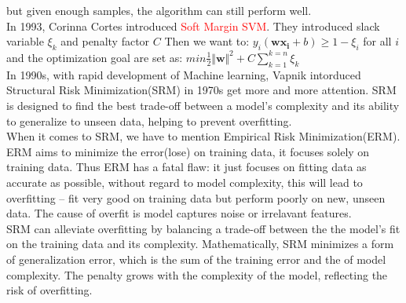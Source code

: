 \documentclass{article}
\begin{document}
but given enough samples, the algorithm can still perform well.\\
\indent In 1993, Corinna Cortes introduced \textcolor{red}{Soft Margin SVM}. They introduced slack variable $\xi_k$ and penalty factor $C$ Then we want to:
$y_i(\bm{w}\bm{x_i} + b) \geq 1 - \xi_i $ for all $i$ \\
and the optimization goal are set as: $min   \frac{1}{2}\Vert \bm{w} \Vert^2 + C\sum_{k=1}^{k=n}\xi_k$\\
\indent In 1990s, with rapid development of Machine learning, Vapnik intorduced Structural Risk Minimization(SRM) in 1970s get more and more attention.
SRM is designed to find the best trade-off between a model’s complexity and its ability to generalize to unseen data, helping to prevent overfitting.\\
\indent When it comes to SRM, we have to mention Empirical Risk Minimization(ERM). ERM aims to minimize the error(lose) on training data, it focuses solely on training data.
Thus ERM has a fatal flaw: it just focuses on fitting data as accurate as possible, without regard to model complexity, this will lead to overfitting
-- fit very good on training data but perform poorly on new, unseen data. The cause of overfit is model captures noise or irrelavant features.\\
\indent SRM can alleviate overfitting by balancing a trade-off between the the model’s fit on the training data and its complexity. 
Mathematically, SRM minimizes a form of generalization error, which is the sum of the training error and the  of model complexity. 
The penalty grows with the complexity of the model, reflecting the risk of overfitting.
\end{document}

